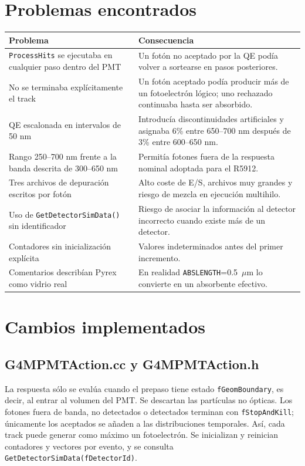 \documentclass[11pt,a4paper]{article}
\begin{document}
\section{Problemas encontrados}
\begin{longtable}{>{\raggedright\arraybackslash}p{}
                  >{\raggedright\arraybackslash}p{}}
\toprule
Problema & Consecuencia \\
\midrule\endhead
\texttt{ProcessHits} se ejecutaba en cualquier paso dentro del PMT &
Un fotón no aceptado por la QE podía volver a sortearse en pasos posteriores. \\
No se terminaba explícitamente el track & Un fotón aceptado podía producir más
de un fotoelectrón lógico; uno rechazado continuaba hasta ser absorbido. \\
QE escalonada en intervalos de 50 nm & Introducía discontinuidades artificiales
y asignaba 6\% entre 650--700 nm después de 3\% entre 600--650 nm. \\
Rango 250--700 nm frente a la banda descrita de 300--650 nm & Permitía fotones
fuera de la respuesta nominal adoptada para el R5912. \\
Tres archivos de depuración escritos por fotón & Alto coste de E/S, archivos
muy grandes y riesgo de mezcla en ejecución multihilo. \\
Uso de \texttt{GetDetectorSimData()} sin identificador & Riesgo de asociar la
información al detector incorrecto cuando existe más de un detector. \\
Contadores sin inicialización explícita & Valores indeterminados antes del
primer incremento. \\
Comentarios describían Pyrex como vidrio real & En realidad
\texttt{ABSLENGTH}=0.5~$\mu$m lo convierte en un absorbente efectivo. \\
\bottomrule
\end{longtable}

\section{Cambios implementados}
\subsection{G4MPMTAction.cc y G4MPMTAction.h}
La respuesta sólo se evalúa cuando el prepaso tiene estado
\texttt{fGeomBoundary}, es decir, al entrar al volumen del PMT. Se descartan las
partículas no ópticas. Los fotones fuera de banda, no detectados o detectados
terminan con \texttt{fStopAndKill}; únicamente los aceptados se añaden a las
distribuciones temporales. Así, cada track puede generar como máximo un
fotoelectrón. Se inicializan y reinician contadores y vectores por evento, y se
consulta \texttt{GetDetectorSimData(fDetectorId)}.
\end{document}
